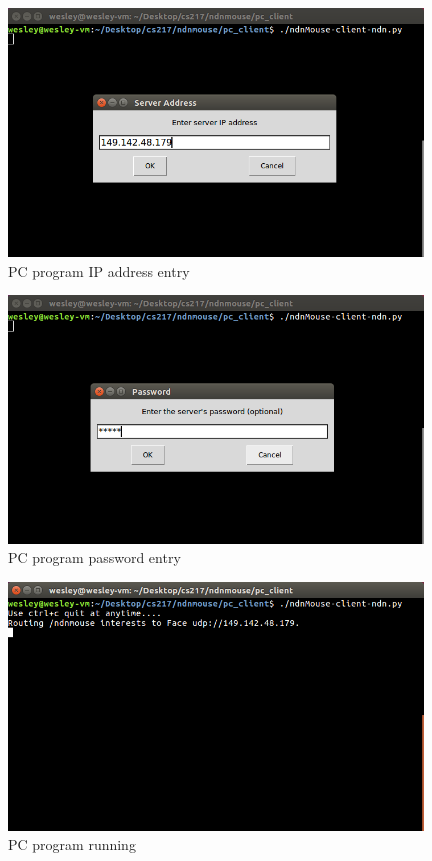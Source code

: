 \documentclass{sig-alternate}
\renewcommand\_{\textunderscore\allowbreak}  %
\begin{document}
\begin{figure}[hp]
	\hypertarget{fig:client1}{}
	\centering
	\includegraphics[width=11cm]{screenshots/client1}
	\caption{PC program IP address entry}
\end{figure}

\begin{figure}[hp]
	\hypertarget{fig:client2}{}
	\centering
	\includegraphics[width=11cm]{screenshots/client2}
	\caption{PC program password entry}
\end{figure}

\begin{figure}[hp]
	\hypertarget{fig:client3}{}
	\centering
	\includegraphics[width=11cm]{screenshots/client3}
	\caption{PC program running}
\end{figure}
\end{document}

